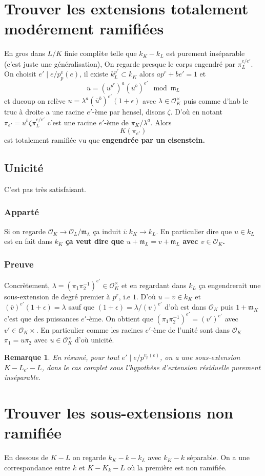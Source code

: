 \documentclass[a4paper,12pt]{book}
\newcommand{\Or}{\mathcal{O}}
\newcommand{\m}{\mathfrak m}
\theoremstyle{plain}
\newtheorem{rem}{Remarque}
\theoremstyle{definition}
\theoremstyle{remark}
\begin{document}
\section{Trouver les extensions totalement modérement ramifiées}
En gros dans $L/K$ finie complète telle que $k_K-k_L$
est purement inséparable (c'est juste une généralisation), 
On regarde presque le corps engendré par $\pi_L^{e/e'}$.
On choisit $e'\mid e/p^v_p(e)$, il existe $k_L^{p^r}\subset k_K$
alors $ap^r+be'=1$ et
\[\bar u=(\bar u^{p^r})^a(\bar u^b)^{e'}\mod \m_L\]
et ducoup on relève $u=\lambda^a(\bar u^b)^{e'}(1+\epsilon)$
avec $\lambda\in \Or_K^\times $ puis comme d'hab le truc à droite
a une racine $e'$-ème par hensel, disons $\zeta$. D'où en notant
$\pi_{e'}=u^b\zeta\pi_L^{e/e'}$ c'est une racine $e'$-ème de 
$\pi_K/\lambda^a$. Alors
\[K(\pi_{e'})\]
est totalement ramifiée vu que 
\textbf{engendrée par un eisenstein.}

\subsection{Unicité}
C'est pas très satisfaisant.
\subsubsection{Apparté}
Si on regarde $\Or_K\to\Or_L/\m_L$ ça induit $i\colon k_K\to k_L$.
En particulier dire que $u\in k_L$ est en fait dans $k_K$ 
\textbf{ça veut dire que $u+\m_L=v+\m_L$ avec $v\in \Or_K$.}
\subsubsection{Preuve}
Concrètement, $\lambda=(\pi_1\pi_2^{-1})^{e'}\in \Or_K^\times$ et
en regardant dans $k_L$ ça engendrerait une sous-extension de 
degré premier à $p^r$, i.e $1$. D'où $\bar u=\bar v\in k_K$ et
$(\bar v)^{e'}(1+\epsilon)=\lambda$ sauf que 
$(1+\epsilon)=\lambda/(v)^{e'}$ d'où est dans $\Or_K$ puis
$1+\m_K$ c'est que des puissances $e'$-ème. On obtient que
$(\pi_1\pi_2^{-1})^{e'}=(v')^{e'}$ avec $v'\in \Or_K\times$.
En particulier comme les racines $e'$-ème de l'unité sont dans
$\Or_K$ $\pi_1=u\pi_2$ avec $u\in\Or_K^\times$ d'où unicité.


\begin{rem}
    En résumé, pour tout $e'\mid e/p^{v_p(e)}$, on a une 
    sous-extension $K-L_{e'}-L$, dans le cas complet sous
    l'hypothèse d'extension résiduelle purement inséparable.
\end{rem}
\section{Trouver les sous-extensions non ramifiée}
En dessous de $K-L$ on regarde $k_K-k-k_L$ avec $k_K-k$ séparable.
On a une correspondance entre $k$ et $K-K_k-L$ où la première est
non ramifiée.
\end{document}
